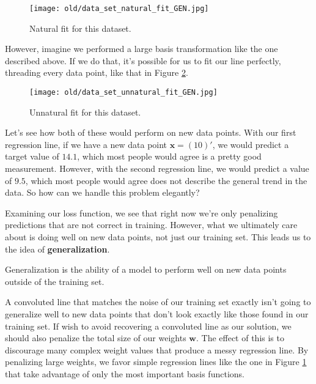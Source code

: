 \begin{figure}
    \centering
    \texttt{[image: old/data\_set\_natural\_fit\_GEN.jpg]}
    \caption{Natural fit for this dataset.}
    \label{fig:data-set-natural-fit}
\end{figure}

However, imagine we performed a large basis transformation like the one described above. If we do that, it's possible for us to fit our line perfectly, threading every data point, like that in Figure \ref{fig:data-set-unnatural-fit}.

\begin{figure}
    \centering
    \texttt{[image: old/data\_set\_unnatural\_fit\_GEN.jpg]}
    \caption{Unnatural fit for this dataset.}
    \label{fig:data-set-unnatural-fit}
\end{figure}

Let's see how both of these would perform on new data points. With our first regression line, if we have a new data point $\mathbf{x} = (10)'$, we would predict a target value of $\mathbf{14.1}$, which most people would agree is a pretty good measurement. However, with the second regression line, we would predict a value of $\mathbf{9.5}$, which most people would agree does not describe the general trend in the data. So how can we handle this problem elegantly?

Examining our loss function, we see that right now we're only penalizing predictions that are not correct in training. However, what we ultimately care about is doing well on new data points, not just our training set. This leads us to the idea of \textbf{generalization}.

\begin{definition}[generalization]
    Generalization is the ability of a model to perform well on new data points outside of the training set.
\end{definition}

A convoluted line that matches the noise of our training set exactly isn't going to generalize well to new data points that don't look exactly like those found in our training set. If wish to avoid recovering a convoluted line as our solution, we should also penalize the total size of our weights $\mathbf{w}$. The effect of this is to discourage many complex weight values that produce a messy regression line. By penalizing large weights, we favor simple regression lines like the one in Figure \ref{fig:data-set-natural-fit} that take advantage of only the most important basis functions.


